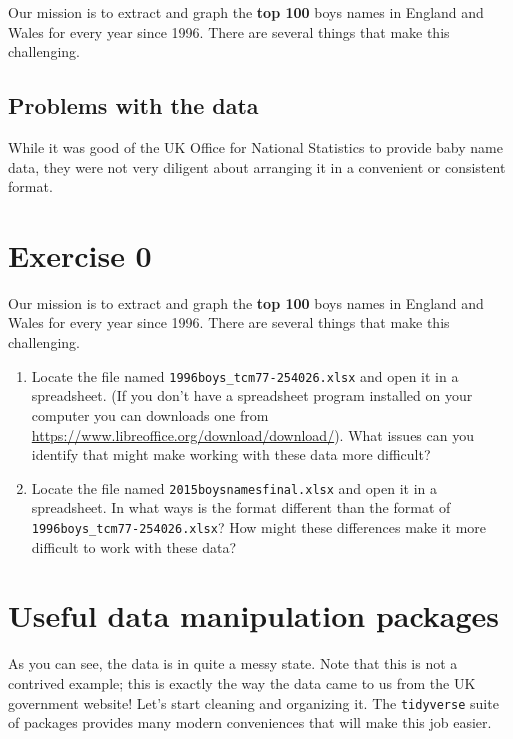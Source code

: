 \documentclass[]{book}
\begin{document}
Our mission is to extract and graph the \textbf{top 100} boys names in
England and Wales for every year since 1996. There are several things
that make this challenging.

\subsection{Problems with the data}\label{problems-with-the-data}

While it was good of the UK Office for National Statistics to provide
baby name data, they were not very diligent about arranging it in a
convenient or consistent format.

\section{Exercise 0}\label{exercise-0-3}

Our mission is to extract and graph the \textbf{top 100} boys names in
England and Wales for every year since 1996. There are several things
that make this challenging.

\begin{enumerate}
\def\labelenumi{\arabic{enumi}.}
\item
  Locate the file named \texttt{1996boys\_tcm77-254026.xlsx} and open it
  in a spreadsheet. (If you don't have a spreadsheet program installed
  on your computer you can downloads one from
  \url{https://www.libreoffice.org/download/download/}). What issues can
  you identify that might make working with these data more difficult?
\item
  Locate the file named \texttt{2015boysnamesfinal.xlsx} and open it in
  a spreadsheet. In what ways is the format different than the format of
  \texttt{1996boys\_tcm77-254026.xlsx}? How might these differences make
  it more difficult to work with these data?
\end{enumerate}

\section{Useful data manipulation
packages}\label{useful-data-manipulation-packages}

As you can see, the data is in quite a messy state. Note that this is
not a contrived example; this is exactly the way the data came to us
from the UK government website! Let's start cleaning and organizing it.
The \texttt{tidyverse} suite of packages provides many modern
conveniences that will make this job easier.
\end{document}

